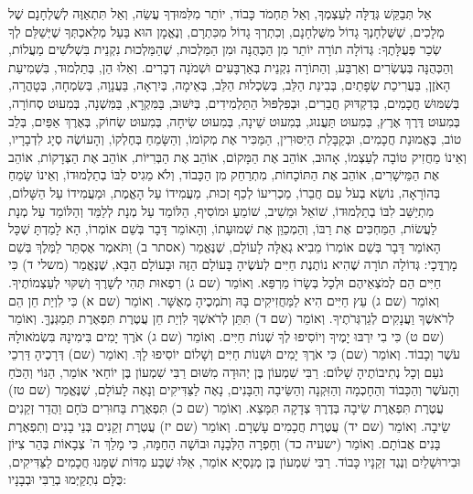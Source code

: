 אַל תְּבַקֵּשׁ גְּדֻלָּה לְעַצְמְךָ, וְאַל תַּחְמֹד כָּבוֹד, יוֹתֵר מִלִּמּוּדְךָ עֲשֵׂה, וְאַל תִּתְאַוֶּה לְשֻׁלְחָנָם שֶׁל מְלָכִים, שֶׁשֻּׁלְחָנְךָ גָדוֹל מִשֻּׁלְחָנָם, וְכִתְרְךָ גָדוֹל מִכִּתְרָם, וְנֶאֱמָן הוּא בַּעַל מְלַאכְתְּךָ שֶׁיְּשַׁלֵּם לְךָ שְׂכַר פְּעֻלָּתֶךָ:
גְּדוֹלָה תוֹרָה יוֹתֵר מִן הַכְּהֻנָּה וּמִן הַמַּלְכוּת, שֶׁהַמַּלְכוּת נִקְנֵית בִּשְׁלֹשִׁים מַעֲלוֹת, וְהַכְּהֻנָּה בְּעֶשְׂרִים וְאַרְבַּע, וְהַתּוֹרָה נִקְנֵית בְּאַרְבָּעִים וּשְׁמֹנָה דְבָרִים. וְאֵלוּ הֵן, בְּתַלְמוּד, בִּשְׁמִיעַת הָאֹזֶן, בַּעֲרִיכַת שְׂפָתַיִם, בְּבִינַת הַלֵּב, בְּשִׂכְלוּת הַלֵּב, בְּאֵימָה, בְּיִרְאָה, בַּעֲנָוָה, בְּשִׂמְחָה, בְּטָהֳרָה, בְּשִׁמּוּשׁ חֲכָמִים, בְּדִקְדּוּק חֲבֵרִים, וּבְפִלְפּוּל הַתַּלְמִידִים, בְּיִשּׁוּב, בַּמִּקְרָא, בַּמִּשְׁנָה, בְּמִעוּט סְחוֹרָה, בְּמִעוּט דֶּרֶךְ אֶרֶץ, בְּמִעוּט תַּעֲנוּג, בְּמִעוּט שֵׁינָה, בְּמִעוּט שִׂיחָה, בְּמִעוּט שְׂחוֹק, בְּאֶרֶךְ אַפַּיִם, בְּלֵב טוֹב, בֶּאֱמוּנַת חֲכָמִים, וּבְקַבָּלַת הַיִּסּוּרִין, הַמַּכִּיר אֶת מְקוֹמוֹ, וְהַשָּׂמֵחַ בְּחֶלְקוֹ, וְהָעוֹשֶׂה סְיָג לִדְבָרָיו, וְאֵינוֹ מַחֲזִיק טוֹבָה לְעַצְמוֹ, אָהוּב, אוֹהֵב אֶת הַמָּקוֹם, אוֹהֵב אֶת הַבְּרִיּוֹת, אוֹהֵב אֶת הַצְּדָקוֹת, אוֹהֵב אֶת הַמֵּישָׁרִים, אוֹהֵב אֶת הַתּוֹכָחוֹת, מִתְרַחֵק מִן הַכָּבוֹד, וְלֹא מֵגִיס לִבּוֹ בְתַלְמוּדוֹ, וְאֵינוֹ שָׂמֵחַ בְּהוֹרָאָה, נוֹשֵׂא בְעֹל עִם חֲבֵרוֹ, מַכְרִיעוֹ לְכַף זְכוּת, מַעֲמִידוֹ עַל הָאֱמֶת, וּמַעֲמִידוֹ עַל הַשָּׁלוֹם, מִתְיַשֵּׁב לִבּוֹ בְתַלְמוּדוֹ, שׁוֹאֵל וּמֵשִׁיב, שׁוֹמֵעַ וּמוֹסִיף, הַלּוֹמֵד עַל מְנָת לְלַמֵּד וְהַלּוֹמֵד עַל מְנָת לַעֲשׂוֹת, הַמַּחְכִּים אֶת רַבּוֹ, וְהַמְכַוֵּן אֶת שְׁמוּעָתוֹ, וְהָאוֹמֵר דָּבָר בְּשֵׁם אוֹמְרוֹ, הָא לָמַדְתָּ שֶׁכָּל הָאוֹמֵר דָּבָר בְּשֵׁם אוֹמְרוֹ מֵבִיא גְאֻלָּה לָעוֹלָם, שֶׁנֶּאֱמַר (אסתר ב) וַתֹּאמֶר אֶסְתֵּר לַמֶּלֶךְ בְּשֵׁם מָרְדֳּכָי:
גְּדוֹלָה תוֹרָה שֶׁהִיא נוֹתֶנֶת חַיִּים לְעֹשֶׂיהָ בָּעוֹלָם הַזֶּה וּבָעוֹלָם הַבָּא, שֶׁנֶּאֱמַר (משלי ד) כִּי חַיִּים הֵם לְמֹצְאֵיהֶם וּלְכָל בְּשָׂרוֹ מַרְפֵּא. וְאוֹמֵר (שם ג) רִפְאוּת תְּהִי לְשָׁרֶךָ וְשִׁקּוּי לְעַצְמוֹתֶיךָ. וְאוֹמֵר (שם ג) עֵץ חַיִּים הִיא לַמַּחֲזִיקִים בָּהּ וְתֹמְכֶיהָ מְאֻשָּׁר. וְאוֹמֵר (שם א) כִּי לִוְיַת חֵן הֵם לְרֹאשֶׁךָ וַעֲנָקִים לְגַרְגְּרֹתֶיךָ. וְאוֹמֵר (שם ד) תִּתֵּן לְרֹאשְׁךָ לִוְיַת חֵן עֲטֶרֶת תִּפְאֶרֶת תְּמַגְּנֶךָּ. וְאוֹמֵר (שם ט) כִּי בִי יִרְבּוּ יָמֶיךָ וְיוֹסִיפוּ לְךָ שְׁנוֹת חַיִּים. וְאוֹמֵר (שם ג) אֹרֶךְ יָמִים בִּימִינָהּ בִּשְׂמֹאולָהּ עֹשֶׁר וְכָבוֹד. וְאוֹמֵר (שם) כִּי אֹרֶךְ יָמִים וּשְׁנוֹת חַיִּים וְשָׁלוֹם יוֹסִיפוּ לָךְ. וְאוֹמֵר (שם) דְּרָכֶיהָ דַּרְכֵי נֹעַם וְכָל נְתִיבוֹתֶיהָ שָׁלוֹם:
רַבִּי שִׁמְעוֹן בֶּן יְהוּדָה מִשּׁוּם רַבִּי שִׁמְעוֹן בֶּן יוֹחַאי אוֹמֵר, הַנּוֹי וְהַכֹּחַ וְהָעֹשֶׁר וְהַכָּבוֹד וְהַחָכְמָה וְהַזִּקְנָה וְהַשֵּׂיבָה וְהַבָּנִים, נָאֶה לַצַּדִּיקִים וְנָאֶה לָעוֹלָם, שֶׁנֶּאֱמַר (שם טז) עֲטֶרֶת תִּפְאֶרֶת שֵׂיבָה בְּדֶרֶךְ צְדָקָה תִּמָּצֵא. וְאוֹמֵר (שם כ) תִּפְאֶרֶת בַּחוּרִים כֹּחָם וַהֲדַר זְקֵנִים שֵׂיבָה. וְאוֹמֵר (שם יד) עֲטֶרֶת חֲכָמִים עָשְׁרָם. וְאוֹמֵר (שם יז) עֲטֶרֶת זְקֵנִים בְּנֵי בָנִים וְתִפְאֶרֶת בָּנִים אֲבוֹתָם. וְאוֹמֵר (ישעיה כד) וְחָפְרָה הַלְּבָנָה וּבוֹשָׁה הַחַמָּה, כִּי מָלַךְ ה' צְבָאוֹת בְּהַר צִיּוֹן וּבִירוּשָׁלַיִם וְנֶגֶד זְקֵנָיו כָּבוֹד. רַבִּי שִׁמְעוֹן בֶּן מְנַסְיָא אוֹמֵר, אֵלּוּ שֶׁבַע מִדּוֹת שֶׁמָּנוּ חֲכָמִים לַצַּדִּיקִים, כֻּלָּם נִתְקַיְּמוּ בְרַבִּי וּבְבָנָיו:

